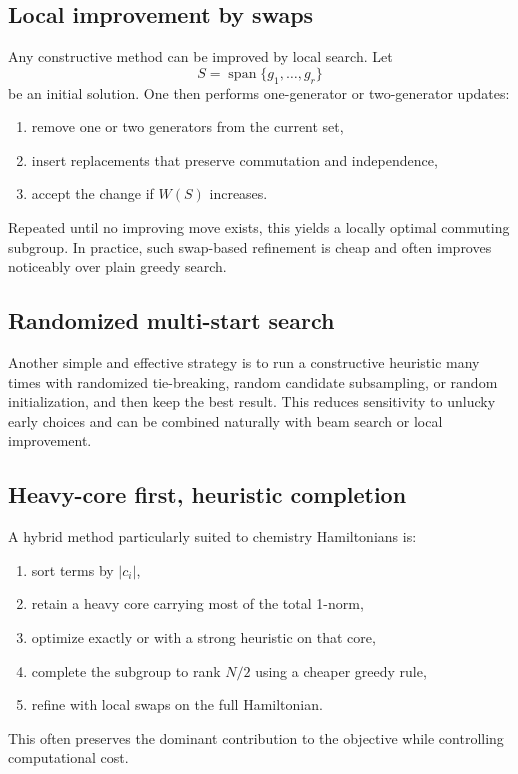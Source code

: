 \documentclass[11pt]{article}
\begin{document}
\subsection{Local improvement by swaps}
Any constructive method can be improved by local search. Let
\begin{equation}
  S = \operatorname{span}\{g_1,\dots,g_r\}
\end{equation}
be an initial solution. One then performs one-generator or two-generator updates:
\begin{enumerate}[label=\arabic*.]
  \item remove one or two generators from the current set,
  \item insert replacements that preserve commutation and independence,
  \item accept the change if $W(S)$ increases.
\end{enumerate}
Repeated until no improving move exists, this yields a locally optimal commuting subgroup. In practice, such swap-based refinement is cheap and often improves noticeably over plain greedy search.

\subsection{Randomized multi-start search}
Another simple and effective strategy is to run a constructive heuristic many times with randomized tie-breaking, random candidate subsampling, or random initialization, and then keep the best result. This reduces sensitivity to unlucky early choices and can be combined naturally with beam search or local improvement.

\subsection{Heavy-core first, heuristic completion}
A hybrid method particularly suited to chemistry Hamiltonians is:
\begin{enumerate}[label=\arabic*.]
  \item sort terms by $|c_i|$,
  \item retain a heavy core carrying most of the total 1-norm,
  \item optimize exactly or with a strong heuristic on that core,
  \item complete the subgroup to rank $N/2$ using a cheaper greedy rule,
  \item refine with local swaps on the full Hamiltonian.
\end{enumerate}
This often preserves the dominant contribution to the objective while controlling computational cost.
\end{document}
